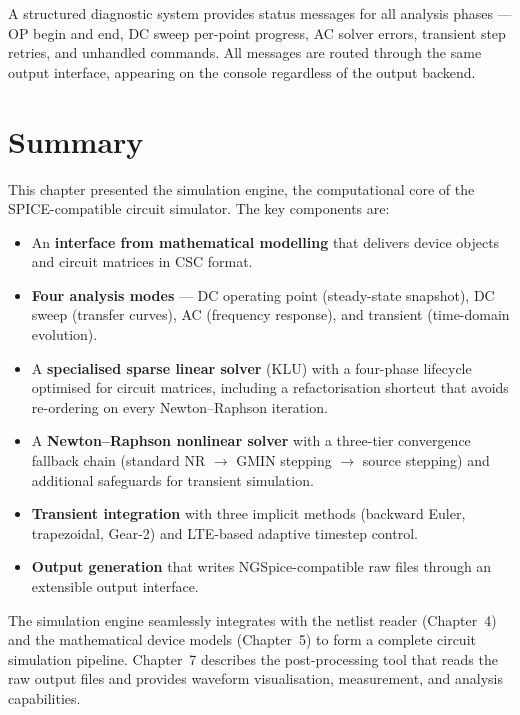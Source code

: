 A structured diagnostic system provides status messages for all analysis phases --- OP begin and end, DC sweep per-point progress, AC solver errors, transient step retries, and unhandled commands. All messages are routed through the same output interface, appearing on the console regardless of the output backend.

\section{Summary}

This chapter presented the simulation engine, the computational core of the SPICE-compatible circuit simulator. The key components are:
\begin{itemize}
  \item An \textbf{interface from mathematical modelling} that delivers device objects and circuit matrices in CSC format.
  \item \textbf{Four analysis modes} --- DC operating point (steady-state snapshot), DC sweep (transfer curves), AC (frequency response), and transient (time-domain evolution).
  \item A \textbf{specialised sparse linear solver} (KLU) with a four-phase lifecycle optimised for circuit matrices, including a refactorisation shortcut that avoids re-ordering on every Newton--Raphson iteration.
  \item A \textbf{Newton--Raphson nonlinear solver} with a three-tier convergence fallback chain (standard NR $\rightarrow$ GMIN stepping $\rightarrow$ source stepping) and additional safeguards for transient simulation.
  \item \textbf{Transient integration} with three implicit methods (backward Euler, trapezoidal, Gear-2) and LTE-based adaptive timestep control.
  \item \textbf{Output generation} that writes NGSpice-compatible raw files through an extensible output interface.
\end{itemize}

The simulation engine seamlessly integrates with the netlist reader (Chapter~4) and the mathematical device models (Chapter~5) to form a complete circuit simulation pipeline. Chapter~7 describes the post-processing tool that reads the raw output files and provides waveform visualisation, measurement, and analysis capabilities.
